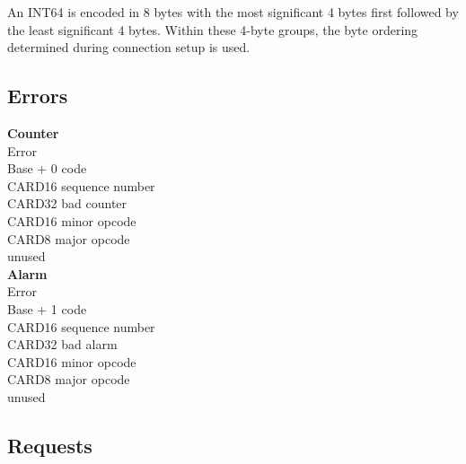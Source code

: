 An INT64 is encoded in 8 bytes with the most significant 4 bytes
first followed by the least significant 4 bytes.  Within these
4-byte groups, the byte ordering determined during connection setup
is used.

\subsection{Errors}

\begin{tabbing}
\tabstopsC
{\bf Counter}\\
				\> Error \\
		\> Base + 0	\> code \\
		\> CARD16	\> sequence number \\
		\> CARD32	\> bad counter \\
		\> CARD16	\> minor opcode \\
		\> CARD8	\> major opcode \\
		\>		\> unused \\
{\bf Alarm}\\
				\> Error \\
		\> Base + 1	\> code \\
		\> CARD16	\> sequence number \\
		\> CARD32	\> bad alarm \\
		\> CARD16	\> minor opcode \\
		\> CARD8	\> major opcode \\
		\>		\> unused \\
\end{tabbing}

\subsection{Requests}

